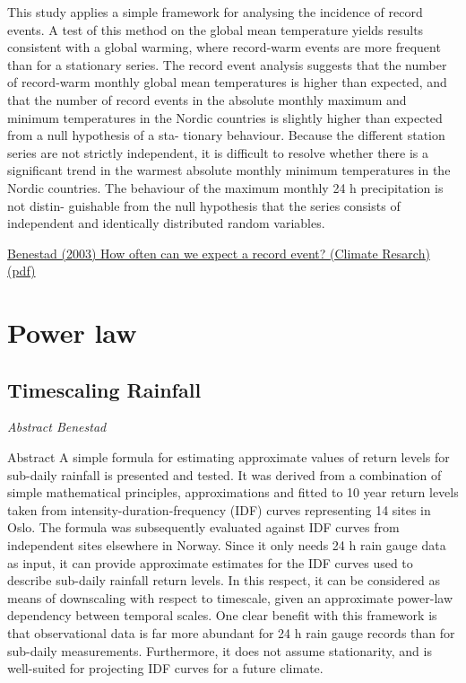 \documentclass[
]{book}
\begin{document}
This study applies a simple framework for analysing the incidence of record events. A
test of this method on the global mean temperature yields results consistent with a global warming,
where record-warm events are more frequent than for a stationary series. The record event analysis
suggests that the number of record-warm monthly global mean temperatures is higher than
expected, and that the number of record events in the absolute monthly maximum and minimum
temperatures in the Nordic countries is slightly higher than expected from a null hypothesis of a sta-
tionary behaviour. Because the different station series are not strictly independent, it is difficult to
resolve whether there is a significant trend in the warmest absolute monthly minimum temperatures
in the Nordic countries. The behaviour of the maximum monthly 24 h precipitation is not distin-
guishable from the null hypothesis that the series consists of independent and identically distributed
random variables.

\href{pdf/Benestad_2003_How_often_record_event.pdf}{Benestad (2003) How often can we expect a record event? (Climate Resarch) (pdf)}

\hypertarget{power-law}{%
\chapter{Power law}\label{power-law}}

\hypertarget{timescaling-rainfall}{%
\section{Timescaling Rainfall}\label{timescaling-rainfall}}

\emph{Abstract Benestad}

Abstract
A simple formula for estimating approximate values of return levels for sub-daily rainfall is
presented and tested. It was derived from a combination of simple mathematical principles,
approximations and fitted to 10 year return levels taken from intensity-duration-frequency (IDF)
curves representing 14 sites in Oslo. The formula was subsequently evaluated against IDF curves
from independent sites elsewhere in Norway. Since it only needs 24 h rain gauge data as input, it
can provide approximate estimates for the IDF curves used to describe sub-daily rainfall return
levels. In this respect, it can be considered as means of downscaling with respect to timescale, given
an approximate power-law dependency between temporal scales. One clear benefit with this
framework is that observational data is far more abundant for 24 h rain gauge records than for
sub-daily measurements. Furthermore, it does not assume stationarity, and is well-suited for
projecting IDF curves for a future climate.
\end{document}
